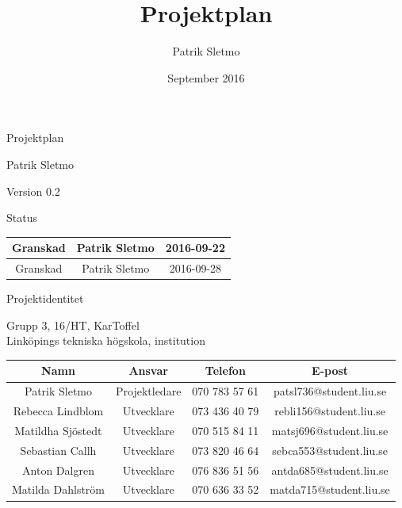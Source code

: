 \documentclass{article}
\title{Projektplan}
\author{Patrik Sletmo}
\date{September 2016}
\begin{document}
\graphicspath{{./images/}}

\thispagestyle{empty}

{
\sffamily
\centering
\large


{\huge
Projektplan
}

{\large
Patrik Sletmo
}

{\large
Version 0.2
}

\vspace{13.5cm}

Status
\begin{center}
\begin{tabular}{ | c | c | c | }
\hline
Granskad & Patrik Sletmo & 2016-09-22 \\
\hline
Granskad & Patrik Sletmo & 2016-09-28 \\
\hline
\end{tabular}
\end{center}
}

\clearpage

\vspace*{\fill}
{
\sffamily
\centering
\large


{\huge
Projektidentitet
}

{\large
Grupp 3, 16/HT, KarToffel \\ Linköpings tekniska högskola, institution
}

\vspace{0.5cm}

\begin{table}[H]
\centering
\begin{tabular}{ | c | c | c | c |}
\hline
Namn & Ansvar & Telefon & E-post \\
\hline
Patrik Sletmo & Projektledare & 070 783 57 61 & patsl736@student.liu.se \\
\hline
Rebecca Lindblom & Utvecklare & 073 436 40 79 & rebli156@student.liu.se \\
\hline
Matildha Sjöstedt & Utvecklare & 070 515 84 11 & matsj696@student.liu.se \\
\hline
Sebastian Callh & Utvecklare & 073 820 46 64 & sebca553@student.liu.se \\
\hline
Anton Dalgren & Utvecklare & 076 836 51 56 & antda685@student.liu.se \\
\hline
Matilda Dahlström & Utvecklare & 070 636 33 52 & matda715@student.liu.se \\
\hline
\end{tabular}
\end{table}
}
\end{document}
